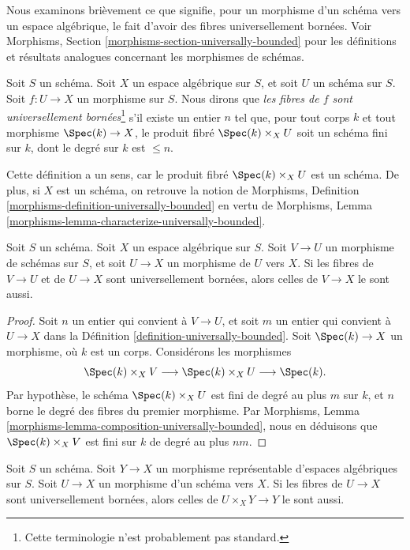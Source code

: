 \noindent
Nous examinons brièvement ce que signifie, pour un morphisme d'un schéma vers
un espace algébrique, le fait d'avoir des fibres universellement bornées. Voir
Morphisms, Section \ref{morphisms-section-universally-bounded}
pour les définitions et résultats analogues concernant les morphismes de
schémas.

\begin{definition}
\label{definition-universally-bounded}
Soit $S$ un schéma. Soit $X$ un espace algébrique sur $S$, et soit
$U$ un schéma sur $S$. Soit $f : U \to X$ un morphisme sur $S$.
Nous dirons que {\it les fibres de $f$ sont universellement
bornées}\footnote{Cette terminologie n'est probablement pas standard.}
s'il existe un entier $n$ tel que, pour tout corps $k$ et tout morphisme
$\Spec(k) \to X$, le produit fibré $\Spec(k) \times_X U$ soit un schéma fini
sur $k$, dont le degré sur $k$ est $\leq n$.
\end{definition}

\noindent
Cette définition a un sens, car le produit fibré
$\Spec(k) \times_X U$ est un schéma. De plus, si $X$ est un schéma,
on retrouve la notion de
Morphisms, Definition \ref{morphisms-definition-universally-bounded}
en vertu de
Morphisms, Lemma \ref{morphisms-lemma-characterize-universally-bounded}.

\begin{lemma}
\label{lemma-composition-universally-bounded}
Soit $S$ un schéma. Soit $X$ un espace algébrique sur $S$.
Soit $V \to U$ un morphisme de schémas sur $S$, et soit
$U \to X$ un morphisme de $U$ vers $X$. Si les fibres de
$V \to U$ et de $U \to X$ sont universellement bornées, alors celles de
$V \to X$ le sont aussi.
\end{lemma}

\begin{proof}
Soit $n$ un entier qui convient à $V \to U$, et soit $m$ un entier qui
convient à $U \to X$ dans la
Définition \ref{definition-universally-bounded}.
Soit $\Spec(k) \to X$ un morphisme, où $k$ est un corps.
Considérons les morphismes
$$
\Spec(k) \times_X V
\longrightarrow
\Spec(k) \times_X U
\longrightarrow
\Spec(k).
$$
Par hypothèse, le schéma $\Spec(k) \times_X U$ est fini de degré au plus $m$
sur $k$, et $n$ borne le degré des fibres du premier morphisme. Par
Morphisms, Lemma \ref{morphisms-lemma-composition-universally-bounded},
nous en déduisons que $\Spec(k) \times_X V$ est fini sur $k$ de degré au plus
$nm$.
\end{proof}

\begin{lemma}
\label{lemma-base-change-universally-bounded}
Soit $S$ un schéma.
Soit $Y \to X$ un morphisme représentable d'espaces algébriques sur $S$.
Soit $U \to X$ un morphisme d'un schéma vers $X$.
Si les fibres de $U \to X$ sont universellement bornées, alors celles de
$U \times_X Y \to Y$ le sont aussi.
\end{lemma}

